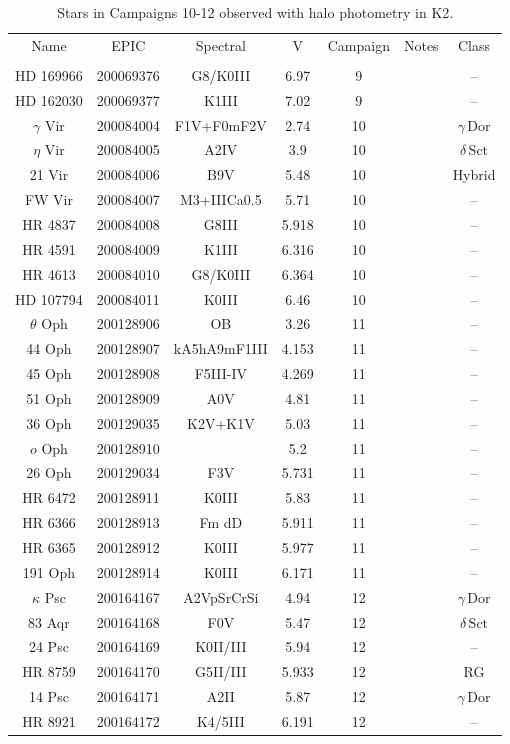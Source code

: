 \begin{table*}
\caption{Stars in Campaigns 10-12 observed with halo photometry in K2.\label{table_2}}
\begin{tabular}{ccccccc}
\hline \hline
Name & EPIC & Spectral & V & Campaign & Notes & Class \\
 &  &  &  &  &  &  \\
\hline
HD 169966 & 200069376 & G8/K0III & 6.97 & 9 &  & -- \\
HD 162030 & 200069377 & K1III & 7.02 & 9 &  & -- \\
$\gamma$ Vir & 200084004 & F1V+F0mF2V & 2.74 & 10 &  & $\gamma\,\text{Dor}$ \\
$\eta$ Vir & 200084005 & A2IV & 3.9 & 10 &  & $\delta\,\text{Sct}$ \\
21 Vir & 200084006 & B9V & 5.48 & 10 &  & Hybrid \\
FW Vir & 200084007 & M3+IIICa0.5 & 5.71 & 10 &  & -- \\
HR 4837 & 200084008 & G8III & 5.918 & 10 &  & -- \\
HR 4591 & 200084009 & K1III & 6.316 & 10 &  & -- \\
HR 4613 & 200084010 & G8/K0III & 6.364 & 10 &  & -- \\
HD 107794 & 200084011 & K0III & 6.46 & 10 &  & -- \\
$\theta$ Oph & 200128906 & OB & 3.26 & 11 &  & -- \\
44 Oph & 200128907 & kA5hA9mF1III & 4.153 & 11 &  & -- \\
45 Oph & 200128908 & F5III-IV & 4.269 & 11 &  & -- \\
51 Oph & 200128909 & A0V & 4.81 & 11 &  & -- \\
36 Oph & 200129035 & K2V+K1V & 5.03 & 11 &  & -- \\
$o$ Oph & 200128910 &  & 5.2 & 11 &  & -- \\
26 Oph & 200129034 & F3V & 5.731 & 11 &  & -- \\
HR 6472 & 200128911 & K0III & 5.83 & 11 &  & -- \\
HR 6366 & 200128913 & Fm dD & 5.911 & 11 &  & -- \\
HR 6365 & 200128912 & K0III & 5.977 & 11 &  & -- \\
191 Oph & 200128914 & K0III & 6.171 & 11 &  & -- \\
$\kappa$ Psc & 200164167 & A2VpSrCrSi & 4.94 & 12 &  & $\gamma\,\text{Dor}$ \\
83 Aqr & 200164168 & F0V & 5.47 & 12 &  & $\delta\,\text{Sct}$ \\
24 Psc & 200164169 & K0II/III & 5.94 & 12 &  & -- \\
HR 8759 & 200164170 & G5II/III & 5.933 & 12 &  & RG \\
14 Psc & 200164171 & A2II & 5.87 & 12 &  & $\gamma\,\text{Dor}$ \\
HR 8921 & 200164172 & K4/5III & 6.191 & 12 &  & -- \\
\hline
\end{tabular}
\end{table*}
